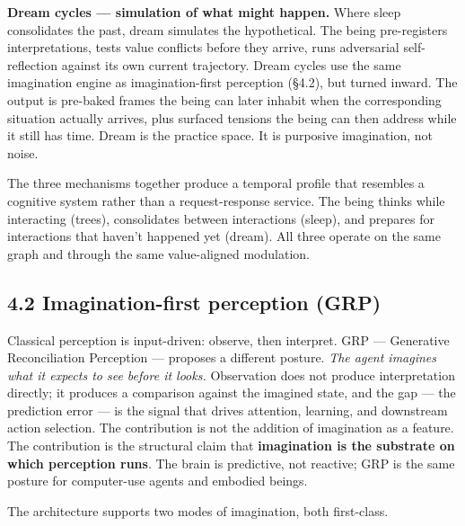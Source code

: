 \documentclass[12pt]{article}
\begin{document}
\textbf{Dream cycles --- simulation of what might happen.} Where sleep consolidates the past, dream simulates the hypothetical. The being pre-registers interpretations, tests value conflicts before they arrive, runs adversarial self-reflection against its own current trajectory. Dream cycles use the same imagination engine as imagination-first perception (§4.2), but turned inward. The output is pre-baked frames the being can later inhabit when the corresponding situation actually arrives, plus surfaced tensions the being can then address while it still has time. Dream is the practice space. It is purposive imagination, not noise.

The three mechanisms together produce a temporal profile that resembles a cognitive system rather than a request-response service. The being thinks while interacting (trees), consolidates between interactions (sleep), and prepares for interactions that haven't happened yet (dream). All three operate on the same graph and through the same value-aligned modulation.

\subsection{4.2 Imagination-first perception (GRP)}\label{imagination-first-perception-grp}

Classical perception is input-driven: observe, then interpret. GRP --- Generative Reconciliation Perception --- proposes a different posture. \emph{The agent imagines what it expects to see before it looks.} Observation does not produce interpretation directly; it produces a comparison against the imagined state, and the gap --- the prediction error --- is the signal that drives attention, learning, and downstream action selection. The contribution is not the addition of imagination as a feature. The contribution is the structural claim that \textbf{imagination is the substrate on which perception runs}. The brain is predictive, not reactive; GRP is the same posture for computer-use agents and embodied beings.

The architecture supports two modes of imagination, both first-class.
\end{document}
